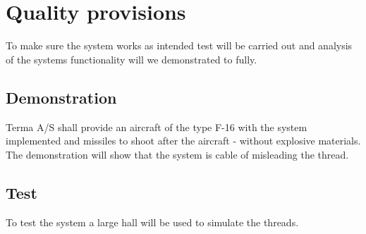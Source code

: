 \documentclass[Main]{subfiles}
\begin{document}
\chapter{Quality provisions}
To make sure the system works as intended test will be carried out and analysis of the systems functionality will we demonstrated to fully.


\section{Demonstration}
Terma A/S shall provide an aircraft of the type F-16 with the system implemented and missiles to shoot after the aircraft - without explosive materials. 
The demonstration will show that the system is cable of misleading the thread.

\section{Test}
To test the system a large hall will be used to simulate the threads.
\end{document}
